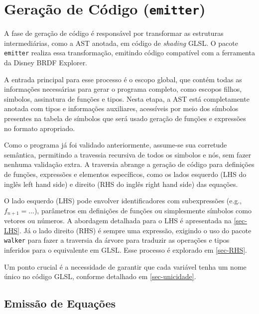 
\section{Geração de Código (\texttt{emitter})} \label{section-emitter}

A fase de geração de código é responsável por transformar as estruturas intermediárias, como a AST anotada, em código de \textit{shading} GLSL. O pacote \texttt{emitter} realiza essa transformação, emitindo código compatível com a ferramenta da Disney BRDF Explorer.

A entrada principal para esse processo é o escopo global, que contém todas as informações necessárias para gerar o programa completo, como escopos filhos, simbolos, assinatura de funções e tipos. Nesta etapa, a AST está completamente anotada com tipos e informações auxiliares, acessíveis por meio dos símbolos presentes na tabela de símbolos que será usado geração de funções e expressões no formato apropriado.

Como o programa já foi validado anteriormente, assume-se sua corretude semântica, permitindo a travessia recursiva de todos os simbolos e nós, sem fazer nenhuma validação extra. A traversia abrange a geração de código para definições de funções, expressões e elementos específicos, como os lados esquerdo (LHS do inglês left hand side) e direito (RHS do inglês right hand side) das equações.

O lado esquerdo (LHS) pode envolver identificadores com subexpressões (e.g., $f_{n+1} = \dots$), parâmetros em definições de funções ou simplesmente símbolos como vetores ou números. A abordagem detalhada para o LHS é apresentada na \autoref{sec-LHS}. Já o lado direito (RHS) é sempre uma expressão, exigindo o uso do pacote \texttt{walker} para fazer a traversia da árvore para traduzir as operações e tipos inferidos para o equivalente em GLSL. Esse processo é explorado em \autoref{sec-RHS}.

Um ponto crucial é a necessidade de garantir que cada variável tenha um nome único no código GLSL, conforme detalhado em \autoref{sec-unicidade}.

\subsection{Emissão de Equações}

